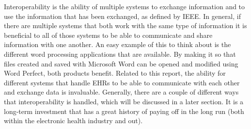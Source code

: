 \documentclass[14pt]{article}
\begin{document}

Interoperability is the ability of multiple systems to exchange information and to use the information that has been exchanged, as defined by \gls{IEEE}.  In general, if there are multiple systems that both work with the same type of information it is beneficial to all of those systems to be able to communicate and share information with one another.  An easy example of this to think about is the different word processing applications that are available.  By making it so that files created and saved with Microsoft Word can be opened and modified using Word Perfect, both products benefit.  Related to this report, the ability for different systems that handle \glspl{EHR} to be able to communicate with each other and exchange data is invaluable.  Generally, there are a couple of different ways that interoperability is handled, which will be discussed in a later section.  It is a long-term investment that has a great history of paying off in the long run (both within the electronic health industry and out).

\label{sec:interopDefinition}
\end{document}
